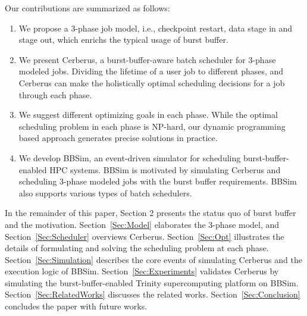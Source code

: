 Our contributions are summarized as follows:
\begin{enumerate}
        \item %
                We propose a 3-phase job model, i.e.,  checkpoint restart,
                data stage in and stage out, which enrichs the typical usage of burst buffer.
        \item   We present Cerberus,
                a burst-buffer-aware batch scheduler for 3-phase modeled jobs.
                Dividing the lifetime of a user job to different phases, and
                Cerberus can make the holistically optimal scheduling decisions 
                for a job through each phase.
        \item   We suggest different optimizing goals in each phase.
                While the optimal scheduling problem in each phase is NP-hard,
                our dynamic programming based approach generates precise solutions
                in practice.
        \item   We develop BBSim, an event-driven simulator for scheduling
                burst-buffer-enabled HPC systems.
                BBSim is motivated by simulating Cerberus and scheduling
                3-phase modeled jobs with the burst buffer requirements.
                BBSim also supports various types of batch schedulers.
\end{enumerate}


In the remainder of this paper, Section 2 presents the status quo of burst buffer and
the motivation.
Section~\ref{Sec:Model} elaborates the 3-phase model, and Section~\ref{Sec:Scheduler} overviews Cerberus. 
Section~\ref{Sec:Opt} illustrates the details of formulating and solving the scheduling problem at each phase. Section~\ref{Sec:Simulation} describes the core events of simulating Cerberus and the execution logic of BBSim. Section~\ref{Sec:Experiments} validates Cerberus by simulating the burst-buffer-enabled
Trinity supercomputing platform on BBSim. Section~\ref{Sec:RelatedWorks} discusses the related works. 
Section~\ref{Sec:Conclusion} concludes the paper with future works.


